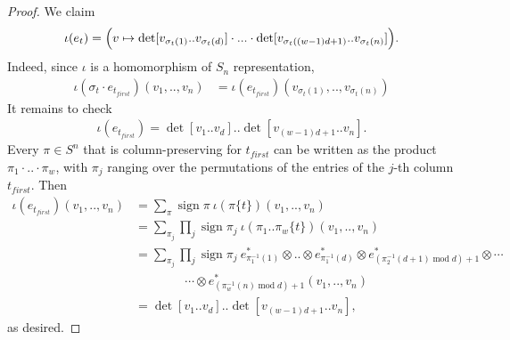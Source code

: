\documentclass{scrartcl}
\theoremstyle{plain}
\theoremstyle{definition}
\newcommand{\1}[1]{1_{\{#1\}}}
\newcommand{\ds}{d} %
\newcommand{\sign}{\operatorname{sign}}
\begin{document}
\begin{proof}
  We claim
  \begin{align*}
    \iota( e_t )
    =
    \Bigl( v \mapsto \det[ v_{\sigma_t(1)} .. v_{\sigma_t(\ds)} ] \cdot ... \cdot \det[ v_{\sigma_t((w-1)\ds + 1)} .. v_{\sigma_t(n)}] \Bigr).
  \end{align*}
  Indeed, since $\iota$ is a homomorphism of $S_n$ representation,
  \begin{align*}
    \iota( \sigma_t \cdot e_{t_{first}} )(v_1,..,v_n)
    &=
    \iota( e_{t_{first}} )(v_{\sigma_t(1)},..,v_{\sigma_t(n)})
  \end{align*}
  It remains to check
  \begin{align*}
    \iota( e_{t_{first}} ) = \det[v_1..v_\ds] ..\det[v_{(w-1)\ds+1} .. v_n].
  \end{align*}
  Every $\pi \in S^n$ that is column-preserving for $t_{first}$
  can be written as
  the product $\pi_1 \cdot .. \cdot \pi_w$,
  with $\pi_j$ ranging over the permutations of the entries of the $j$-th column $t_{first}$.
  Then
  \newcommand{\modd}{\operatorname{mod}}
  \begin{align*}
    \iota( e_{t_{first}} )(v_1,..,v_n)
    &=
    \sum_\pi \sign \pi\ \iota( \pi \{t\} )( v_1, .., v_n ) \\
    &=
    \sum_{\pi_j} \prod_j \sign \pi_j\ \iota( \pi_1 .. \pi_w \{t\} )( v_1, .., v_n ) \\
    &=
    \sum_{\pi_j} \prod_j \sign \pi_j\ 
    e^*_{\pi^{-1}_1(1)} \otimes .. \otimes e^*_{\pi^{-1}_1(d)}
    \otimes
    e^*_{(\pi^{-1}_2(d+1) \modd d) + 1} \otimes\cdots
    \\&\qquad\qquad\cdots \otimes e^*_{(\pi^{-1}_w(n) \modd d) + 1} (v_1,..,v_n) \\
    &=
    \det[v_1..v_\ds] ..\det[v_{(w-1)d+1} .. v_n],
  \end{align*}
  as desired.

\end{proof}
\end{document}
